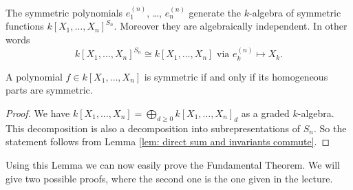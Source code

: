 \begin{thrm}
  The symmetric polynomials $e^{(n)}_1$, \dots, $e^{(n)}_n$ generate the $k$-algebra of symmetric functions $k[X_1, \dotsc, X_n]^{S_n}$.
  Moreover they are algebraically independent.
  In other words
  \[
            k[X_1, \dotsc, X_n]^{S_n}
    \cong   k[X_1, \dotsc, X_n]
    \text{ via }
            e^{(n)}_k
    \mapsto X_k.
  \]
\end{thrm}


\begin{lem}
  A polynomial $f \in k[X_1, \dotsc, X_n]$ is symmetric if and only if its homogeneous parts are symmetric.
\end{lem}
\begin{proof}
  We have $k[X_1, \dotsc, X_n] = \bigoplus_{d \geq 0} k[X_1, \dotsc, X_n]_d$ as a graded $k$-algebra.
  This decomposition is also a decomposition into subrepresentations of $S_n$.
  So the statement follows from Lemma \ref{lem: direct sum and invariants commute}.
\end{proof}


Using this Lemma we can now easily prove the Fundamental Theorem.
We will give two possible proofs, where the second one is the one given in the lecture.


